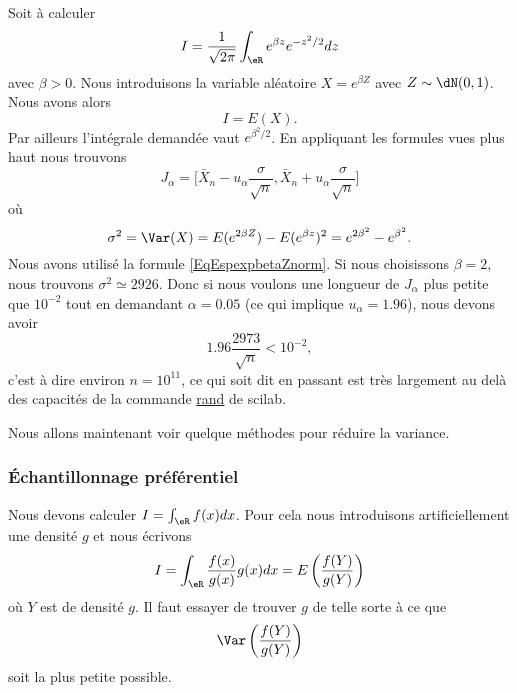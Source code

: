 \begin{example}
    Soit à calculer 
    \begin{equation}
        I=\frac{1}{ \sqrt{2\pi} }\int_{\eR} e^{\beta z} e^{-z^2/2}dz
    \end{equation}
    avec \( \beta>0\). Nous introduisons la variable aléatoire \( X= e^{\beta Z}\) avec \( Z\sim\dN(0,1)\). Nous avons alors 
    \begin{equation}
        I=E(X).
    \end{equation}
    Par ailleurs l'intégrale demandée vaut \(  e^{\beta^2/2}\). En appliquant les formules vues plus haut nous trouvons
    \begin{equation}
        J_{\alpha}=\big[ \bar X_n-u_{\alpha}\frac{ \sigma }{ \sqrt{n} },\bar X_n+u_{\alpha}\frac{ \sigma }{ \sqrt{n} } \big]
    \end{equation}
    où
    \begin{equation}
        \sigma^2=\Var(X)=E( e^{2\beta Z})-E( e^{\beta z})^2= e^{2\beta^2}- e^{\beta^2}.
    \end{equation}
    Nous avons utilisé la formule \eqref{EqEspexpbetaZnorm}. Si nous choisissons \( \beta=2\), nous trouvons \( \sigma^2\simeq 2926\). Donc si nous voulons une longueur de \( J_{\alpha}\) plus petite que \( 10^{-2}\) tout en demandant \( \alpha=0.05\) (ce qui implique \( u_{\alpha}=1.96\)), nous devons avoir
    \begin{equation}
        1.96\frac{ 2973 }{ \sqrt{n} }<10^{-2},
    \end{equation}
    c'est à dire environ \( n=10^{11}\), ce qui soit dit en passant est très largement au delà des capacités de la commande \href{http://www.iecn.u-nancy.fr/~pincon/scilab/Doc/node85.html}{rand} de scilab.
\end{example}

Nous allons maintenant voir quelque méthodes pour réduire la variance.

\subsubsection{Échantillonnage préférentiel}

Nous devons calculer \( I=\int_{\eR}f(x)dx\). Pour cela nous introduisons artificiellement une densité \( g\) et nous écrivons
\begin{equation}
    I=\int_{\eR}\frac{ f(x) }{ g(x) }g(x)dx=E\left( \frac{ f(Y) }{ g(Y) } \right)
\end{equation}
où \( Y\) est de densité \( g\). Il faut essayer de trouver \( g\) de telle sorte à ce que 
\begin{equation}
    \Var\left( \frac{ f(Y) }{ g(Y) } \right)
\end{equation}
soit la plus petite possible.

